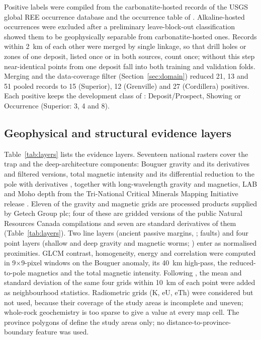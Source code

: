 \documentclass[pdflatex,sn-apa]{sn-jnl}
\begin{document}
Positive labels were compiled from the carbonatite-hosted records of the USGS global REE occurrence database \citep{Orris2018} and the occurrence table of \citet{Parsa2024}. Alkaline-hosted occurrences were excluded after a preliminary leave-block-out classification showed them to be geophysically separable from carbonatite-hosted ones. Records within 2~km of each other were merged by single linkage, so that drill holes or zones of one deposit, listed once or in both sources, count once; without this step near-identical points from one deposit fall into both training and validation folds. Merging and the data-coverage filter (Section~\ref{sec:domain}) reduced 21, 13 and 51 pooled records to 15 (Superior), 12 (Grenville) and 27 (Cordillera) positives. Each positive keeps the development class of \citet{Parsa2024}: Deposit/Prospect, Showing or Occurrence (Superior: 3, 4 and 8).

\subsection{Geophysical and structural evidence layers}\label{sec:layers}

Table~\ref{tab:layers} lists the evidence layers. Seventeen national rasters cover the trap and the deep-architecture components: Bouguer gravity and its derivatives and filtered versions, total magnetic intensity and its differential reduction to the pole with derivatives \citep{Jobin2017,Miles2016}, together with long-wavelength gravity and magnetics, LAB and Moho depth from the Tri-National Critical Minerals Mapping Initiative release \citep{McCafferty2023}. Eleven of the gravity and magnetic grids are processed products supplied by Getech Group plc; four of these are gridded versions of the public Natural Resources Canada compilations and seven are standard derivatives of them (Table~\ref{tab:layers}). Two line layers (ancient passive margins, \citealp{BradleyDC2008}; faults) and four point layers (shallow and deep gravity and magnetic worms; \citealp{McCafferty2023}) enter as normalised proximities. GLCM contrast, homogeneity, energy and correlation were computed in 9$\times$9-pixel windows on the Bouguer anomaly, its 40~km high-pass, the reduced-to-pole magnetics and the total magnetic intensity. Following \citet{Luo2026}, the mean and standard deviation of the same four grids within 10~km of each point were added as neighbourhood statistics. Radiometric grids (K, eU, eTh) were considered but not used, because their coverage of the study areas is incomplete and uneven; whole-rock geochemistry is too sparse to give a value at every map cell. The province polygons of \citet{Wheeler1996} define the study areas only; no distance-to-province-boundary feature was used.
\end{document}
